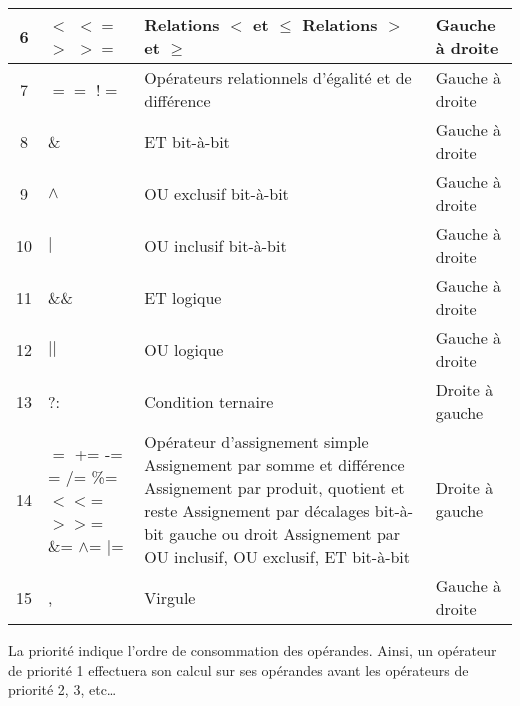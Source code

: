 \documentclass[../../../main.tex]{subfiles}
\begin{document}
\begin{center}
\begin{tabular}{|c|p{}|p{}|l|}
\hline
6 & $<$ $<=$ \newline $>$ $>=$ & Relations $<$ et $\leq$ \newline Relations $>$ et $\geq$ & Gauche à droite \\
\hline
7 & $==$ $!=$ & Opérateurs relationnels d'égalité et de différence & Gauche à droite \\
\hline
8 & \& & ET bit-à-bit & Gauche à droite \\
\hline
9 & $\wedge$ & OU exclusif bit-à-bit & Gauche à droite \\
\hline
10 & $|$ & OU inclusif bit-à-bit & Gauche à droite \\
\hline
11 & \&\& & ET logique & Gauche à droite \\
\hline
12 & $||$ & OU logique & Gauche à droite \\
\hline
13 & ?: & Condition ternaire & Droite à gauche \\
\hline
14 & $=$ \newline += -= \newline *= /= \%= \newline $<<$= $>>$= \&= $\wedge$= $|$= & Opérateur d'assignement simple \newline Assignement par somme et différence \newline Assignement par produit, quotient et reste \newline Assignement par décalages bit-à-bit gauche ou droit \newline Assignement par OU inclusif, OU exclusif, ET bit-à-bit & Droite à gauche\\
\hline
15 & , & Virgule & Gauche à droite\\
\hline
\end{tabular}
\label{tab:priorite_operateurs}
\end{center}
La priorité indique l'ordre de consommation des opérandes. Ainsi, un opérateur de priorité 1 effectuera son calcul sur ses opérandes avant les opérateurs de priorité 2, 3, etc\dots
\end{document}
